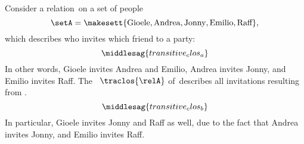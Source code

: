 \begin{example}
    \label{exa:party}
    Consider a relation~\relA on a set of people
    \begin{equation}
        \setA=\makesett{\text{Gioele}, \text{Andrea}, \text{Jonny}, \text{Emilio}, \text{Raff}},
    \end{equation}
    which describes who invites which friend to a party:
    \begin{equation}
        \label{eq:transitive_clos_a}
        \middlesag{transitive_clos_a}
    \end{equation}
    In other words, Gioele invites Andrea and Emilio, Andrea invites Jonny, and Emilio invites Raff.
    The ~$\traclos{\relA}$ of~\relA describes all invitations resulting from .
    \begin{equation}
        \label{eq:transitive_clos_b}
        \middlesag{transitive_clos_b}
    \end{equation}
    In particular, Gioele invites Jonny and Raff as well, due to the fact that Andrea invites Jonny, and Emilio invites Raff.
\end{example}

